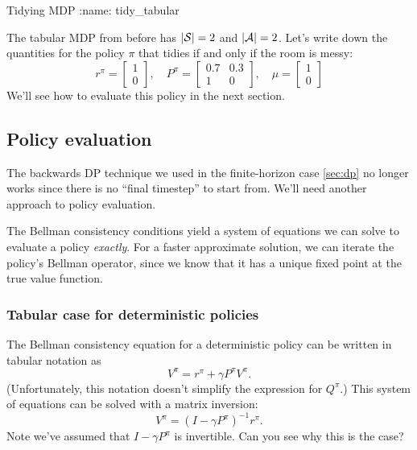 \documentclass[\main/main]{subfiles}
\begin{document}
\begin{example}{Tidying MDP}
:name: tidy_tabular

    The tabular MDP from before has $|\S| = 2$ and $|\A| = 2$. Let's write down the quantities for the policy $\pi$ that tidies if and only if the room is messy:
    \[
        r^{\pi} = \begin{bmatrix} 1 \\ 0 \end{bmatrix}, \quad
        P^{\pi} = \begin{bmatrix} 0.7 & 0.3 \\ 1 & 0 \end{bmatrix}, \quad
        \mu = \begin{bmatrix} 1 \\ 0 \end{bmatrix}
    \]
    We'll see how to evaluate this policy in the next section.
\end{example}

\subsection{Policy evaluation}

The backwards DP technique we used in the finite-horizon case \eqref{sec:dp} no longer works since there is no ``final timestep'' to start from. We'll need another approach to policy evaluation.

The Bellman consistency conditions yield a system of equations we can solve to evaluate a policy \emph{exactly}. For a faster approximate solution, we can iterate the policy's Bellman operator, since we know that it has a unique fixed point at the true value function.


\subsubsection{Tabular case for deterministic policies}

The Bellman consistency equation for a deterministic policy can be written in tabular notation as
\[
    V^\pi = r^\pi + \gamma P^\pi V^\pi.
\]
(Unfortunately, this notation doesn't simplify the expression for $Q^\pi$.) This system of equations can be solved with a matrix inversion:
\begin{equation}
    V^\pi = (I - \gamma P^\pi)^{-1} r^\pi. \label{eq:matrix_inversion_pe}
\end{equation}
Note we've assumed that $I - \gamma P^\pi$ is invertible. Can you see why this is the case?
\end{document}
